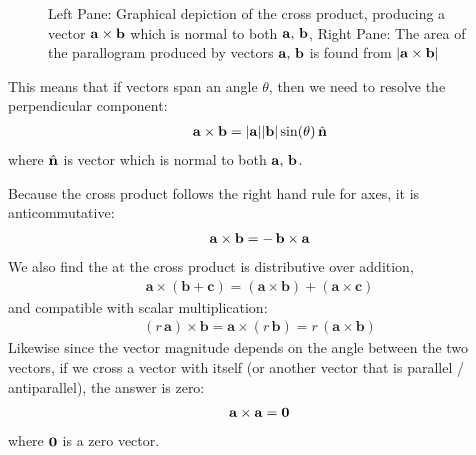 \documentclass[letterpaper,10pt,english]{jupyterBook}
\begin{document}
\begin{figure}[htbp]
\centering
\capstart

\noindent{}
\caption{Left Pane: Graphical depiction of the cross product, producing a vector \(\bf a \times b\) which is normal to both \(\bf a,\, b\),
Right Pane: The area of the parallogram produced by vectors \(\bf a,\, b\) is found from \(|\bf a \times b|\)}\label{\detokenize{VectorCalculus/vectoralgebra:vectorproduct}}\end{figure}

\sphinxAtStartPar
This means that if vectors span an angle \(\theta\), then we need to resolve the perpendicular component:
\begin{equation*}
\begin{split}{\bf a \times b} = {\bf |a||b|}\sin(\theta)\,\hat{\bf n}\end{split}
\end{equation*}
\sphinxAtStartPar
where \(\hat{\bf n}\) is vector which is normal to both \(\bf a,\, b\).

\sphinxAtStartPar
Because the cross product follows the right hand rule for axes, it is anti\sphinxhyphen{}commutative:
\begin{equation*}
\begin{split}\bf a \times b = -\,b \times a\end{split}
\end{equation*}
\sphinxAtStartPar
We also find the at the cross product is distributive over addition,
\begin{equation*}
\begin{split}\mathbf {a} \times (\mathbf {b} +\mathbf {c} )=(\mathbf {a} \times \mathbf {b} )+(\mathbf {a} \times \mathbf {c} )\end{split}
\end{equation*}
\sphinxAtStartPar
and compatible with scalar multiplication:
\begin{equation*}
\begin{split}(r\,\mathbf {a} )\times \mathbf {b} =\mathbf {a} \times (r\,\mathbf {b} )=r\,(\mathbf {a} \times \mathbf {b} )\end{split}
\end{equation*}
\sphinxAtStartPar
Likewise since the vector magnitude depends on the angle between the two vectors, if we cross a vector with itself (or another vector that is parallel / anti\sphinxhyphen{}parallel),
the answer is zero:
\begin{equation*}
\begin{split}\bf a \times a = 0\end{split}
\end{equation*}
\sphinxAtStartPar
where \(\bf 0\) is a zero vector.
\end{document}
